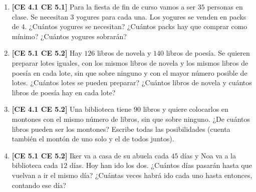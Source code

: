 \documentclass[12pt,a4paper,twoside]{article}
\begin{document}
{     \makeatletter{} \makeatother {} 
\begin{enumerate}\setlength{\itemsep}{1em}
    \item \textbf{[CE 4.1 CE 5.1]} Para la fiesta de fin de curso vamos a ser $35$ personas en clase. Se necesitan $3$ yogures para cada una. Los yogures se venden en packs de $4$. ¿Cuántos yogures se necesitan? ¿Cuántos packs hay que comprar como mínimo? ¿Cuántos yogures sobrarán?
\vspace{8cm}

    \item \textbf{[CE 5.1 CE 5.2]} Hay $126$ libros de novela y $140$ libros de poesía. Se quieren preparar lotes iguales, con los mismos libros de novela y los mismos libros de poesía en cada lote, sin que sobre ninguno y con el mayor número posible de lotes. ¿Cuántos lotes se pueden preparar? ¿Cuántos libros de novela y cuántos libros de poesía hay en cada lote?
\newpage

    \item \textbf{[CE 4.1 CE 5.2]} Una biblioteca tiene $90$ libros y quiere colocarlos en montones con el mismo número de libros, sin que sobre ninguno. ¿De cuántos libros pueden ser los montones? Escribe todas las posibilidades (cuenta también el montón de uno solo y el de todos juntos).
\vspace{10cm}
    
    \item \textbf{[CE 5.1 CE 5.2]} Iker va a casa de su abuela cada $45$ días y Noa va a la biblioteca cada $12$ días. Hoy han ido los dos. ¿Cuántos días pasarán hasta que vuelvan a ir el mismo día? ¿Cuántas veces habrá ido cada uno hasta entonces, contando ese día?
\end{enumerate}
}
\end{document}
